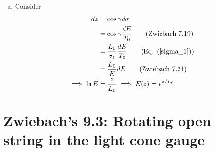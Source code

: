 \documentclass[11pt]{article}
\begin{document}
\begin{enumerate} [(a)]
    \item Consider 
    \begin{align*}
        dz &= \cos \gamma d\sigma \\
        &= \cos \gamma \frac{dE }{T_0 } \tag{Zwiebach 7.19} \\
        &= \frac{L_0}{\sigma_1} \frac{dE}{T_0} \tag{Eq. (\ref{sigma_1})}\\
        &= \frac{L_0}{E}dE \tag{Zwiebach 7.21} \\
        \implies \ln E &= \frac{z}{L_0} \implies E(z) = e^{z/L_0} 
    \end{align*}
\end{enumerate}

\newpage 

\section{Zwiebach's 9.3: Rotating open string in the light cone gauge}
\end{document}
